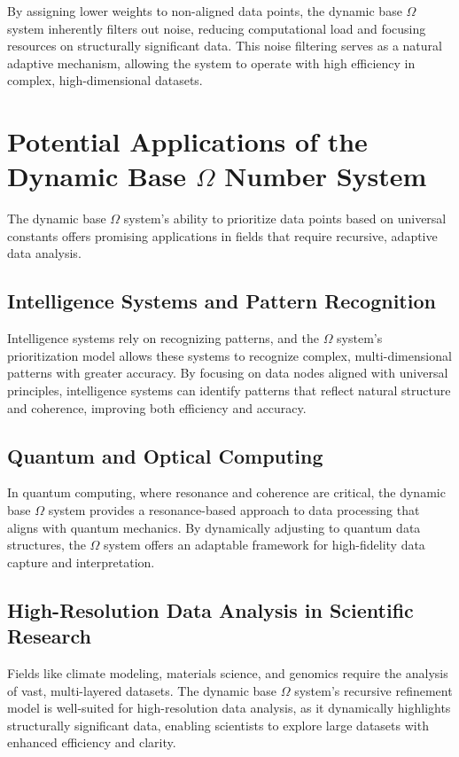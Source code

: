 \documentclass{article}
\begin{document}
By assigning lower weights to non-aligned data points, the dynamic base $\Omega$ system inherently filters out noise, reducing computational load and focusing resources on structurally significant data. This noise filtering serves as a natural adaptive mechanism, allowing the system to operate with high efficiency in complex, high-dimensional datasets.

\section{Potential Applications of the Dynamic Base $\Omega$ Number System}

The dynamic base $\Omega$ system’s ability to prioritize data points based on universal constants offers promising applications in fields that require recursive, adaptive data analysis.

\subsection{Intelligence Systems and Pattern Recognition}

Intelligence systems rely on recognizing patterns, and the $\Omega$ system’s prioritization model allows these systems to recognize complex, multi-dimensional patterns with greater accuracy. By focusing on data nodes aligned with universal principles, intelligence systems can identify patterns that reflect natural structure and coherence, improving both efficiency and accuracy.

\subsection{Quantum and Optical Computing}

In quantum computing, where resonance and coherence are critical, the dynamic base $\Omega$ system provides a resonance-based approach to data processing that aligns with quantum mechanics. By dynamically adjusting to quantum data structures, the $\Omega$ system offers an adaptable framework for high-fidelity data capture and interpretation.

\subsection{High-Resolution Data Analysis in Scientific Research}

Fields like climate modeling, materials science, and genomics require the analysis of vast, multi-layered datasets. The dynamic base $\Omega$ system’s recursive refinement model is well-suited for high-resolution data analysis, as it dynamically highlights structurally significant data, enabling scientists to explore large datasets with enhanced efficiency and clarity.
\end{document}
